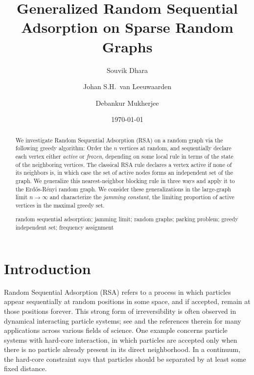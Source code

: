 \documentclass[11pt,a4paper, reqno]{article}
\begin{document}
\title{Generalized Random Sequential Adsorption on Sparse Random Graphs}

\author{Souvik Dhara}
\author{Johan S.H.~van Leeuwaarden}
\author{Debankur Mukherjee}

\date{\today}
\maketitle

\begin{abstract}
We investigate Random Sequential Adsorption (RSA) on a random graph via the following greedy algorithm:
Order the $n$ vertices at random, and sequentially declare each vertex either {\it active} or {\it frozen}, depending on some local rule in terms of the state of the neighboring vertices.
The classical RSA rule declares a vertex active if none of its neighbors is, in which case the set of active nodes forms an independent set of the graph.  We generalize this nearest-neighbor blocking rule in three ways and apply it to the Erd\H{o}s-R\'enyi random graph. We consider these generalizations in the large-graph limit $n\to\infty$ and 
characterize the {\it jamming constant}, the limiting proportion of active vertices in the maximal greedy set.

\vspace{.2cm}  random sequential adsorption; jamming limit; random graphs; parking problem; greedy independent set; frequency assignment
\end{abstract}

\section{Introduction}\label{sec:intro}

Random Sequential Adsorption (RSA) refers to a process in which particles appear sequentially at random positions in some space, and if accepted, remain at those positions forever. This strong form of irreversibility is often observed in dynamical interacting particle systems; see \cite{C14, RM06, P01, CAP07, LTDLV15} and the references therein for many applications across various fields of science. One example concerns particle systems with hard-core interaction, in which particles are accepted only when there is no particle already present in its direct neighborhood. In a continuum, the hard-core constraint says that particles should be separated by at least some fixed distance.
\end{document}
